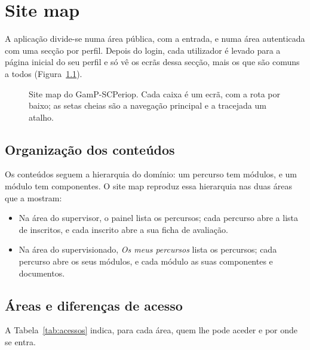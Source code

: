 \chapter{Site map}
\label{cap:sitemap}

A aplicação divide-se numa área pública, com a entrada, e numa área autenticada com uma secção por perfil. Depois do login, cada utilizador é levado para a página inicial do seu perfil e só vê os ecrãs dessa secção, mais os que são comuns a todos (Figura~\ref{fig:sitemap}).

\begin{figure}[H]
    \centering
    \resizebox{\linewidth}{!}{}
    \caption{Site map do GamP-SCPeriop. Cada caixa é um ecrã, com a rota por baixo; as setas cheias são a navegação principal e a tracejada um atalho.}
    \label{fig:sitemap}
\end{figure}

\section{Organização dos conteúdos}

Os conteúdos seguem a hierarquia do domínio: um percurso tem módulos, e um módulo tem componentes. O site map reproduz essa hierarquia nas duas áreas que a mostram:

\begin{itemize}
    \item Na área do supervisor, o painel lista os percursos; cada percurso abre a lista de inscritos, e cada inscrito abre a sua ficha de avaliação.
    \item Na área do supervisionado, \emph{Os meus percursos} lista os percursos; cada percurso abre os seus módulos, e cada módulo as suas componentes e documentos.
\end{itemize}

\section{Áreas e diferenças de acesso}

A Tabela~\ref{tab:acessos} indica, para cada área, quem lhe pode aceder e por onde se entra.

